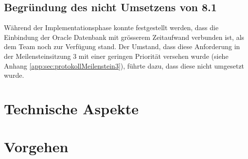 \subsection{Begründung des nicht Umsetzens von 8.1}
Während der Implementationsphase konnte festgestellt werden, dass die Einbindung der Oracle Datenbank mit grösserem Zeitaufwand verbunden ist, als dem Team noch zur Verfügung stand. Der Umstand, dass diese Anforderung in der Meilensteinsitzung 3 mit einer geringen Priorität versehen wurde (siehe Anhang \ref{app:sec:protokollMeilenstein3}), führte dazu, dass diese nicht umgesetzt wurde.

\section{Technische Aspekte}

\section{Vorgehen}
